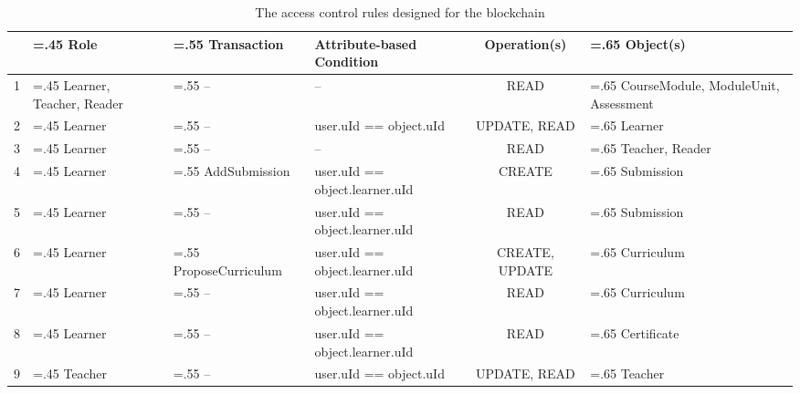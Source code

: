 \begin{landscape}
	\begin{table}[!ht]
		\caption{The access control rules designed for the blockchain}
		\centering
		\label{table:ac_rules}
		\begin{tabularx}{24cm}{l>{\hsize=.45\hsize}X>{\hsize=.55\hsize}X>{\hsize=0.9\hsize}Xc>{\hsize=.65\hsize}X}
			   & Role                     & Transaction       & Attribute-based Condition                                      & Operation(s)   & Object(s)                            \\
			\toprule
			1  & Learner, Teacher, Reader & --                & --                                                             & READ           & CourseModule, ModuleUnit, Assessment \\
			\midrule
			2  & Learner                  & --                & user.uId == object.uId                                         & UPDATE, READ   & Learner                              \\
			\midrule
			3  & Learner                  & --                & --                                                             & READ           & Teacher, Reader                      \\
			\midrule
			4  & Learner                  & AddSubmission     & user.uId == object.learner.uId                                 & CREATE         & Submission                           \\
			\midrule
			5  & Learner                  & --                & user.uId == object.learner.uId                                 & READ           & Submission                           \\
			\midrule
			6  & Learner                  & ProposeCurriculum & user.uId == object.learner.uId                                 & CREATE, UPDATE & Curriculum                           \\
			\midrule
			7  & Learner                  & --                & user.uId == object.learner.uId                                 & READ           & Curriculum                           \\
			\midrule
			8  & Learner                  & --                & user.uId == object.learner.uId                                 & READ           & Certificate\\
			\midrule
			9  & Teacher                  & --                & user.uId == object.uId                                         & UPDATE, READ   & Teacher                              \\

\end{tabularx}
\end{table}
\end{landscape}
